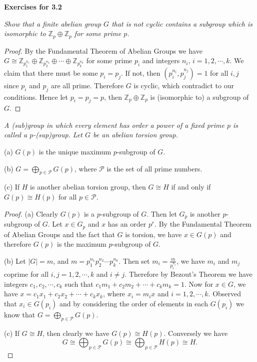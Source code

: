 \begin{center}
\begin{large}
    \textbf{Exercises for 3.2}
\end{large}
\end{center}
\begin{problem}\em
Show that a finite abelian group $G$ that is not cyclic contains a subgroup which is isomorphic to $\mathbb{Z}_p\oplus\mathbb{Z}_p$ for some prime $p$.
\end{problem}
\begin{proof}
By the Fundamental Theorem of Abelian Groups we have $G\cong\mathbb{Z}_{p_1^{n_1}}\oplus\mathbb{Z}_{p_2^{n_2}}\oplus\cdots\oplus\mathbb{Z}_{p_k^{n_k}}$ for some prime $p_i$ and integers $n_i$, $i=1,2,\cdots,k$. We claim that there must be some $p_i=p_j$. If not, then $(p_i^{n_i},p_j^{n_j})=1$ for all $i,j$ since $p_i$ and $p_j$ are all prime. Therefore $G$ is cyclic, which contradict to our conditions. Hence let $p_i=p_j=p$, then $\mathbb{Z}_p\oplus\mathbb{Z}_p$ is (isomorphic to) a subgroup of $G$.
\end{proof}
\begin{problem}\em
A (sub)group in which every element has order a power of a fixed prime $p$ is called a $p$-(sup)group. Let $G$ be an abelian torsion group.\par
(a) $G(p)$ is the unique maximum $p$-subgroup of $G$.\par
(b) $G=\bigoplus_{p\in\mathcal{P}}G(p)$, where $\mathcal{P}$ is the set of all prime numbers.\par
(c) If $H$ is another abelian torsion group, then $G\cong H$ if and only if $G(p)\cong H(p)$ for all $p\in\mathcal{P}$.
\end{problem}
\begin{proof}
(a) Clearly $G(p)$ is a $p$-subgroup of $G$. Then let $G_p$ is another $p$-subgroup of $G$. Let $x\in G_p$ and $x$ has an order $p^r$. By the Fundamental Theorem of Abelian Groups and the fact that $G$ is torsion, we have $x\in G(p)$ and therefore $G(p)$ is the maximum $p$-subgroup of $G$.\par
(b) Let $|G|=m$, and $m=p_1^{n_1}p_2^{n_2}\cdots p_k^{n_k}$. Then set $m_i=\frac{m}{p_i^{n_i}}$, we have $m_i$ and $m_j$ coprime for all $i,j=1,2,\cdots,k$ and $i\ne j$. Therefore by Bezout's Theorem we have integers $c_1,c_2,\cdots,c_k$ such that $c_1m_1+c_2m_2+\cdots+c_km_k=1$. Now for $x\in G$, we have $x=c_1x_1+c_2x_2+\cdots+c_kx_k$, where $x_i=m_ix$ and $i=1,2,\cdots,k$. Observed that $x_i\in G(p_i)$ and by considering the order of elements in each $G(p_i)$ we know that $G=\bigoplus_{p\in\mathcal{P}}G(p)$.\par
(c) If $G\cong H$, then clearly we have $G(p)\cong H(p)$. Conversely we have 
$$G\cong\bigoplus_{p\in\mathcal{P}}G(p)\cong\bigoplus_{p\in\mathcal{P}}H(p)\cong H.$$
\end{proof}
